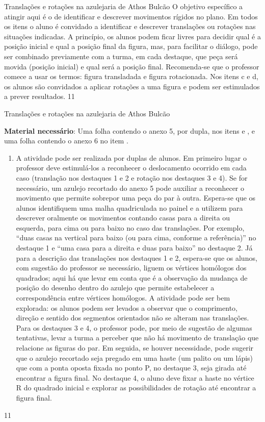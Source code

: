 \marginpar{\vspace{-1.25em}}
\begin{objectives}{Translações e rotações na azulejaria de Athos Bulcão}
{
O objetivo específico a atingir aqui é o de identificar e descrever movimentos rígidos no plano. Em todos os itens o aluno é convidado a identificar e descrever translações ou rotações nas situações indicadas. A princípio, os alunos podem ficar livres para decidir qual é a posição inicial e qual a posição final da figura, mas, para facilitar o diálogo, pode ser combinado previamente com a turma, em cada destaque, que peça será movida (posição inicial) e qual será a posição final. Recomenda-se que o professor comece a usar os termos: figura transladada e figura rotacionada. Nos itens c e d, os alunos são convidados a aplicar rotações a uma figura e podem ser estimulados a prever resultados. 
}{1}{1}
\end{objectives}
\marginpar{\vspace{-2.5em}}
\begin{sugestions}{Translações e rotações na azulejaria de Athos Bulcão}
{
\textbf{Material necessário}: Uma folha contendo o anexo 5, por dupla, nos itens  e , e uma folha contendo o anexo 6 no item .
\begin{enumerate}[label=\titem{\alph*)}]
\item A atividade pode ser realizada por duplas de alunos. Em primeiro lugar o professor deve estimulá-los a reconhecer o deslocamento ocorrido em cada caso (translação nos destaques 1 e 2 e rotação nos destaques 3 e 4). Se for necessário, um azulejo recortado do anexo 5 pode auxiliar a reconhecer o movimento que permite sobrepor uma peça do par à outra. Espera-se que os alunos identifiquem uma malha quadriculada no painel e a utilizem para descrever oralmente os movimentos contando casas para a direita ou esquerda, para cima ou para baixo no caso das translações. Por exemplo, “duas casas na vertical para baixo (ou para cima, conforme a referência)” no destaque 1 e “uma casa para a direita e duas para baixo” no destaque 2. Já para a descrição das translações nos destaques 1 e 2, espera-se que os alunos, com sugestão do professor se necessário, liguem os vértices homólogos dos quadrados; aqui há que levar em conta que é a observação da mudança de posição do desenho dentro do azulejo que permite estabelecer a correspondência entre vértices homólogos. A atividade pode ser bem explorada: os alunos podem ser levados a   observar que o comprimento, direção e sentido dos segmentos orientados não se alteram nas translações. Para os destaques 3 e 4, o professor pode, por meio de sugestão de algumas tentativas, levar a turma a perceber que não há movimento de translação que relacione as figuras do par. Em seguida, se houver necessidade, pode sugerir que o azulejo recortado seja pregado em uma haste (um palito ou um lápis) que com a ponta oposta fixada no ponto P, no destaque 3, seja girada até encontrar a figura final. No destaque 4, o aluno deve fixar a haste no vértice R do quadrado inicial e explorar as possibilidades de rotação até encontrar a figura final. 
\end{enumerate}
}{1}{1}
\end{sugestions}
